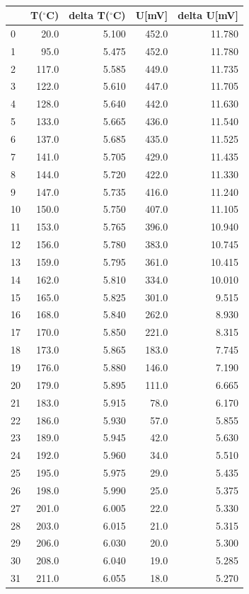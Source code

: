 \documentclass[a4paper,10pt]{article}
\begin{document}
\begin{tabular}{lrrrr}
\toprule
{} &T($^\circ$C)&delta T($^\circ$C)&U[mV]&delta U[mV]\\
\midrule
0  &   20.0 &  5.100 &  452.0 &  11.780 \\
1  &   95.0 &  5.475 &  452.0 &  11.780 \\
2  &  117.0 &  5.585 &  449.0 &  11.735 \\
3  &  122.0 &  5.610 &  447.0 &  11.705 \\
4  &  128.0 &  5.640 &  442.0 &  11.630 \\
5  &  133.0 &  5.665 &  436.0 &  11.540 \\
6  &  137.0 &  5.685 &  435.0 &  11.525 \\
7  &  141.0 &  5.705 &  429.0 &  11.435 \\
8  &  144.0 &  5.720 &  422.0 &  11.330 \\
9  &  147.0 &  5.735 &  416.0 &  11.240 \\
10 &  150.0 &  5.750 &  407.0 &  11.105 \\
11 &  153.0 &  5.765 &  396.0 &  10.940 \\
12 &  156.0 &  5.780 &  383.0 &  10.745 \\
13 &  159.0 &  5.795 &  361.0 &  10.415 \\
14 &  162.0 &  5.810 &  334.0 &  10.010 \\
15 &  165.0 &  5.825 &  301.0 &   9.515 \\
16 &  168.0 &  5.840 &  262.0 &   8.930 \\
17 &  170.0 &  5.850 &  221.0 &   8.315 \\
18 &  173.0 &  5.865 &  183.0 &   7.745 \\
19 &  176.0 &  5.880 &  146.0 &   7.190 \\
20 &  179.0 &  5.895 &  111.0 &   6.665 \\
21 &  183.0 &  5.915 &   78.0 &   6.170 \\
22 &  186.0 &  5.930 &   57.0 &   5.855 \\
23 &  189.0 &  5.945 &   42.0 &   5.630 \\
24 &  192.0 &  5.960 &   34.0 &   5.510 \\
25 &  195.0 &  5.975 &   29.0 &   5.435 \\
26 &  198.0 &  5.990 &   25.0 &   5.375 \\
27 &  201.0 &  6.005 &   22.0 &   5.330 \\
28 &  203.0 &  6.015 &   21.0 &   5.315 \\
29 &  206.0 &  6.030 &   20.0 &   5.300 \\
30 &  208.0 &  6.040 &   19.0 &   5.285 \\
31 &  211.0 &  6.055 &   18.0 &   5.270 \\
\bottomrule
\end{tabular}
\end{document}
